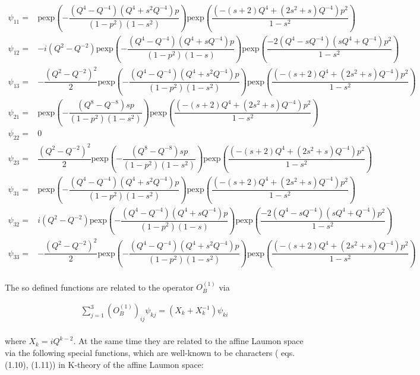 \documentclass{amsart}
\begin{document}
\begin{align*}
\psi_{11} =& \mathrm{pexp}\left( -\dfrac{(Q^4-Q^{-4})(Q^4 + s^2 Q^{-4})p}{(1-p^2)(1-s^2)} \right) \mathrm{pexp}\left( \dfrac{(-(s+2)Q^4 + (2s^2 + s)Q^{-4} ) p^2}{1-s^2} \right) \\
\psi_{12} =& - i (Q^2-Q^{-2}) \mathrm{pexp}\left( -\dfrac{(Q^4-Q^{-4})(Q^4 + s Q^{-4})p}{(1-p^2)(1-s)} \right) \mathrm{pexp}\left( \dfrac{-2(Q^4 - s Q^{-4})(s Q^4 + Q^{-4}) p^2}{1-s^2} \right) \\
\psi_{13} =& - \dfrac{(Q^2-Q^{-2})^2}{2} \mathrm{pexp}\left( -\dfrac{(Q^4-Q^{-4})(Q^4 + s^2 Q^{-4})p}{(1-p^2)(1-s^2)} \right) \mathrm{pexp}\left( \dfrac{(-(s+2)Q^4 + (2s^2 + s)Q^{-4} ) p^2}{1-s^2} \right) \\
\psi_{21} =& \mathrm{pexp}\left( -\dfrac{(Q^8-Q^{-8})sp}{(1-p^2)(1-s^2)} \right) \mathrm{pexp}\left( \dfrac{(-(s+2)Q^4 + (2s^2 + s)Q^{-4} ) p^2}{1-s^2} \right) \\
\psi_{22} =& 0 \\
\psi_{23} =& \dfrac{(Q^2-Q^{-2})^2}{2} \mathrm{pexp}\left( -\dfrac{(Q^8-Q^{-8})sp}{(1-p^2)(1-s^2)} \right) \mathrm{pexp}\left( \dfrac{(-(s+2)Q^4 + (2s^2 + s)Q^{-4} ) p^2}{1-s^2} \right) \\
\psi_{31} =& \mathrm{pexp}\left( -\dfrac{(Q^4-Q^{-4})(Q^4 + s^2 Q^{-4})p}{(1-p^2)(1-s^2)} \right) \mathrm{pexp}\left( \dfrac{(-(s+2)Q^4 + (2s^2 + s)Q^{-4} ) p^2}{1-s^2} \right) \\
\psi_{32} =& i (Q^2-Q^{-2}) \mathrm{pexp}\left( -\dfrac{(Q^4-Q^{-4})(Q^4 + s Q^{-4})p}{(1-p^2)(1-s)} \right) \mathrm{pexp}\left( \dfrac{-2(Q^4 - s Q^{-4})(s Q^4 + Q^{-4}) p^2}{1-s^2} \right) \\
\psi_{33} =& - \dfrac{(Q^2-Q^{-2})^2}{2} \mathrm{pexp}\left( -\dfrac{(Q^4-Q^{-4})(Q^4 + s^2 Q^{-4})p}{(1-p^2)(1-s^2)} \right) \mathrm{pexp}\left( \dfrac{(-(s+2)Q^4 + (2s^2 + s)Q^{-4} ) p^2}{1-s^2} \right)
\end{align*}
\smallskip\\
The so defined functions are related to the operator $O^{(1)}_B$ via

\begin{align*}
\sum\limits_{j=1}^{3} (O^{(1)}_B)_{ij} \psi_{kj} = (X_k+X_k^{-1}) \psi_{ki}    
\end{align*}
\smallskip\\
where $X_k = i Q^{k-2}$. At the same time they are related to the affine Laumon space via the following special functions, which are well-known \cite{Shiraishi'2019} to be characters (\cite{Negut'2011} eqs. (1.10), (1.11)) in K-theory of the affine Laumon space:
\end{document}
